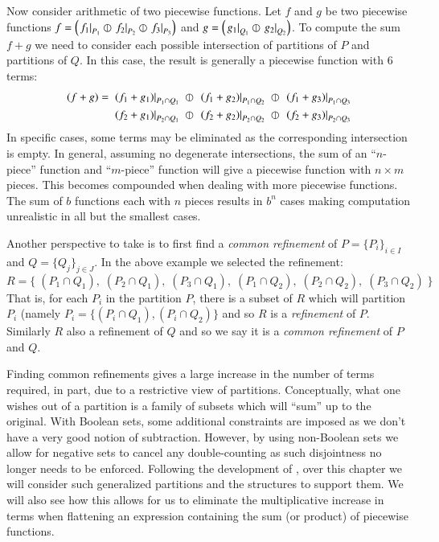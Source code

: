 Now consider arithmetic of two piecewise functions. Let $f$ and $g$ be two piecewise functions
$f = \left(\left.f_1\right|_{P_1} \varobar \left.f_2\right|_{P_2} \varobar \left.f_3\right|_{P_3} \right)$ 
and $g= \left( \left.g_1\right|_{Q_1} \varobar \left.g_2\right|_{Q_2} \right)$.
To compute the sum $f+g$ we need to consider each possible intersection of partitions of $P$ and partitions of $Q$.
In this case, the result is generally a piecewise function with 6 terms:
\begin{align*}
	(f+g) = \;
	&\left.(f_1+g_1)\right|_{P_1 \cap Q_1} 
		\;\varobar\; \left.(f_1+g_2)\right|_{P_1 \cap Q_2} 
		\;\varobar\; \left.(f_1+g_3)\right|_{P_1 \cap Q_3}\notag\\
	&\left.(f_2+g_1)\right|_{P_2 \cap Q_1} 
	 	\;\varobar\; \left.(f_2+g_2)\right|_{P_2 \cap Q_2} 
	 	\;\varobar\; \left.(f_2+g_3)\right|_{P_2 \cap Q_3}
\end{align*}
In specific cases, some terms may be eliminated as the corresponding intersection is empty. 
In general, assuming no degenerate intersections, 
the sum of an ``$n$-piece'' function and ``$m$-piece'' function will give a piecewise function with $n \times m$ pieces.
This becomes compounded when dealing with more piecewise functions. 
The sum of $b$ functions each with $n$ pieces results in $b^n$ cases making computation unrealistic 
in all but the smallest cases.


Another perspective to take is to first find a \emph{common refinement} of ${P=\{P_i\}_{i\in I}}$ 
and ${Q=\{Q_j\}_{j\in J}}$. In the above example we selected the refinement:
\begin{equation*}
	R=\Big\{\;
		(P_1 \cap Q_1),\;(P_2 \cap Q_1),\;(P_3 \cap Q_1),\;
		(P_1 \cap Q_2),\;(P_2 \cap Q_2),\;(P_3 \cap Q_2) \;
	\Big\}
\end{equation*}
That is, for each $P_i$ in the partition $P$, there is a subset of $R$ which will partition $P_i$ 
(namely $P_i = \{ (P_i \cap Q_1), (P_i \cap Q_2) \}$ and so $R$ is a \emph{refinement} of $P$.
Similarly $R$ also a refinement of $Q$ and so we say it is a \emph{common refinement} of $P$ and $Q$.


Finding common refinements gives a large increase in the number of terms required, 
in part, due to a restrictive view of partitions.
Conceptually, what one wishes out of a partition is a family of subsets which will ``sum'' up to the original.
With Boolean sets, some additional constraints are imposed as we don't have a very good notion of subtraction.
However, by using non-Boolean sets we allow for negative sets to cancel any double-counting
as such disjointness no longer needs to be enforced.
Following the development of \cite{carette2010}, over this chapter we will consider such generalized partitions 
and the structures to support them.
We will also see how this allows for us to eliminate the multiplicative increase in terms when flattening an expression
containing the sum (or product) of piecewise functions.





